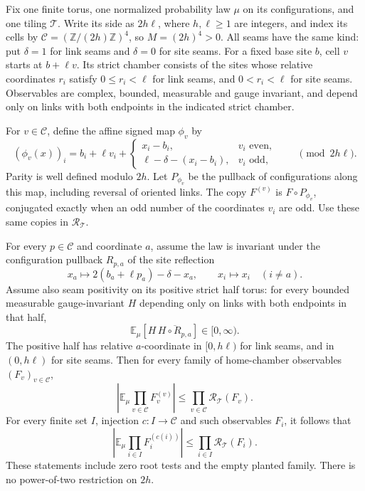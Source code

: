 \begin{proposition}
\label{prop:ex-centered-planted}
Fix one finite torus, one normalized probability law $\mu$ on its
configurations, and one tiling $\mathcal T$. Write its side as $2h\ell$,
where $h,\ell\ge1$ are integers, and index its cells by
$\mathcal C=(\mathbb Z/(2h)\mathbb Z)^4$, so $M=(2h)^4>0$.
All seams have the same kind: put $\delta=1$ for link seams and
$\delta=0$ for site seams. For a fixed base site $b$, cell $v$ starts
at $b+\ell v$. Its strict chamber consists of the sites whose relative
coordinates $r_i$ satisfy $0\le r_i<\ell$ for link seams, and
$0<r_i<\ell$ for site seams. Observables are complex, bounded,
measurable and gauge invariant, and depend only on links with both
endpoints in the indicated strict chamber.

For $v\in\mathcal C$, define the affine signed map $\phi_v$ by
\begin{equation}\label{eq:ex-centered-copy-geometry}
 (\phi_v(x))_i=b_i+\ell v_i+
 \begin{cases}
 x_i-b_i,&v_i\text{ even},\\
 \ell-\delta-(x_i-b_i),&v_i\text{ odd},
 \end{cases}
 \qquad\pmod{2h\ell}.
\end{equation}
Parity is well defined modulo $2h$. Let $P_{\phi_v}$ be the pullback
of configurations along this map, including reversal of oriented links.
The copy $F^{(v)}$ is $F\circ P_{\phi_v}$, conjugated exactly when an
odd number of the coordinates $v_i$ are odd. Use these same copies in
$\mathcal R_{\mathcal T}$.

For every $p\in\mathcal C$ and coordinate $a$, assume the law is
invariant under the configuration pullback $R_{p,a}$ of the site reflection
\[
 x_a\longmapsto2(b_a+\ell p_a)-\delta-x_a,
 \qquad x_i\longmapsto x_i\quad(i\ne a).
\]
Assume also seam positivity on its positive strict half torus: for
every bounded measurable gauge-invariant $H$ depending only on links
with both endpoints in that half,
\begin{equation}\label{eq:ex-centered-seam-positive}
 \mathbb E_\mu[H\,\overline{H\circ R_{p,a}}]\in[0,\infty).
\end{equation}
The positive half has relative $a$-coordinate in $[0,h\ell)$ for
link seams, and in $(0,h\ell)$ for site seams.
Then for every family of home-chamber observables $(F_v)_{v\in\mathcal C}$,
\begin{equation}\label{eq:ex-centered-seam-full}
 \left|\mathbb E_\mu\prod_{v\in\mathcal C}F_v^{(v)}\right|
       \le\prod_{v\in\mathcal C}\mathcal R_{\mathcal T}(F_v).
\end{equation}
For every finite set $I$, injection $c:I\to\mathcal C$ and such
observables $F_i$, it follows that
\begin{equation}\label{eq:ex-centered-seam-planted}
 \left|\mathbb E_\mu\prod_{i\in I}F_i^{(c(i))}\right|
       \le\prod_{i\in I}\mathcal R_{\mathcal T}(F_i).
\end{equation}
These statements include zero root tests and the empty planted family.
There is no power-of-two restriction on $2h$.
\end{proposition}

